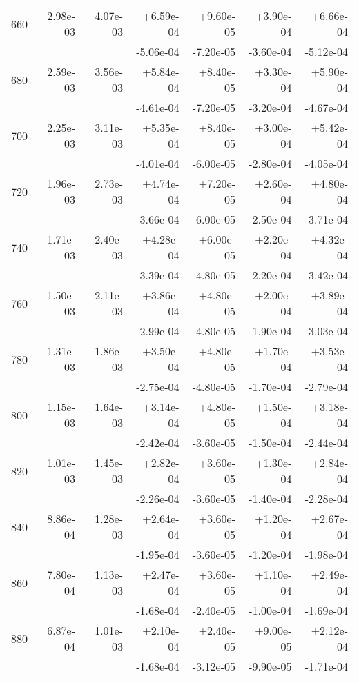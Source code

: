 \begin{tabular}{|c|r|r|r|r|r|r|}
\hline
660 & 2.98e-03 & 4.07e-03 & +6.59e-04 & +9.60e-05 & +3.90e-04 & +6.66e-04 \\
 & & & -5.06e-04 & -7.20e-05 & -3.60e-04 & -5.12e-04 \\
\hline
680 & 2.59e-03 & 3.56e-03 & +5.84e-04 & +8.40e-05 & +3.30e-04 & +5.90e-04 \\
 & & & -4.61e-04 & -7.20e-05 & -3.20e-04 & -4.67e-04 \\
\hline
700 & 2.25e-03 & 3.11e-03 & +5.35e-04 & +8.40e-05 & +3.00e-04 & +5.42e-04 \\
 & & & -4.01e-04 & -6.00e-05 & -2.80e-04 & -4.05e-04 \\
\hline
720 & 1.96e-03 & 2.73e-03 & +4.74e-04 & +7.20e-05 & +2.60e-04 & +4.80e-04 \\
 & & & -3.66e-04 & -6.00e-05 & -2.50e-04 & -3.71e-04 \\
\hline
740 & 1.71e-03 & 2.40e-03 & +4.28e-04 & +6.00e-05 & +2.20e-04 & +4.32e-04 \\
 & & & -3.39e-04 & -4.80e-05 & -2.20e-04 & -3.42e-04 \\
\hline
760 & 1.50e-03 & 2.11e-03 & +3.86e-04 & +4.80e-05 & +2.00e-04 & +3.89e-04 \\
 & & & -2.99e-04 & -4.80e-05 & -1.90e-04 & -3.03e-04 \\
\hline
780 & 1.31e-03 & 1.86e-03 & +3.50e-04 & +4.80e-05 & +1.70e-04 & +3.53e-04 \\
 & & & -2.75e-04 & -4.80e-05 & -1.70e-04 & -2.79e-04 \\
\hline
800 & 1.15e-03 & 1.64e-03 & +3.14e-04 & +4.80e-05 & +1.50e-04 & +3.18e-04 \\
 & & & -2.42e-04 & -3.60e-05 & -1.50e-04 & -2.44e-04 \\
\hline
820 & 1.01e-03 & 1.45e-03 & +2.82e-04 & +3.60e-05 & +1.30e-04 & +2.84e-04 \\
 & & & -2.26e-04 & -3.60e-05 & -1.40e-04 & -2.28e-04 \\
\hline
840 & 8.86e-04 & 1.28e-03 & +2.64e-04 & +3.60e-05 & +1.20e-04 & +2.67e-04 \\
 & & & -1.95e-04 & -3.60e-05 & -1.20e-04 & -1.98e-04 \\
\hline
860 & 7.80e-04 & 1.13e-03 & +2.47e-04 & +3.60e-05 & +1.10e-04 & +2.49e-04 \\
 & & & -1.68e-04 & -2.40e-05 & -1.00e-04 & -1.69e-04 \\
\hline
880 & 6.87e-04 & 1.01e-03 & +2.10e-04 & +2.40e-05 & +9.00e-05 & +2.12e-04 \\
 & & & -1.68e-04 & -3.12e-05 & -9.90e-05 & -1.71e-04 \\

\end{tabular}
